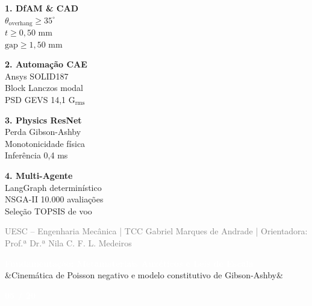 \documentclass[11pt]{article}
\newcommand{\slideheader}[3]{
    \noindent
    \begin{minipage}{\textwidth}
        \colorbox{SpaceNavy}{
            \parbox{\dimexpr\textwidth-2\fboxsep\relax}{
                \vspace{0.2cm}
                \hspace{0.3cm}
                \begin{minipage}{0.85\textwidth}
                    {\Large \textbf{\textcolor{white}{#1}}}\\[0.1cm]
                    \ifx&#2&\else{\small \textbf{\textcolor{SpaceGold}{#2}}}\fi
                \end{minipage}
                \hfill
                \begin{minipage}{0.10\textwidth}
                    \raggedleft
                    {\large \textbf{\textcolor{white}{#3 / 20}}}\hspace{0.3cm}
                \end{minipage}
                \vspace{0.2cm}
            }
        }
    \end{minipage}
    \vspace{0.4cm}
}
\newcommand{\slidefooter}{
    \vfill
    \noindent
    \begin{minipage}{\textwidth}
        \centering
        \scriptsize \textcolor{gray}{UESC -- Engenharia Mecânica | TCC Gabriel Marques de Andrade | Orientadora: Prof.ª Dr.ª Nila C. F. L. Medeiros}
    \end{minipage}
}
\begin{document}
\begin{minipage}[t]{0.23\textwidth}
    \textbf{\textcolor{SpaceNavy}{1. DfAM \& CAD}}\\[0.1cm]
    \scriptsize
    $\theta_{\text{overhang}} \ge 35^\circ$\\
    $t \ge 0{,}50\text{ mm}$\\
    $\text{gap} \ge 1{,}50\text{ mm}$
\end{minipage}
\hfill
\begin{minipage}[t]{0.23\textwidth}
    \textbf{\textcolor{SpaceNavy}{2. Automação CAE}}\\[0.1cm]
    \scriptsize
    Ansys SOLID187\\
    Block Lanczos modal\\
    PSD GEVS 14,1 G$_{\text{rms}}$
\end{minipage}
\hfill
\begin{minipage}[t]{0.23\textwidth}
    \textbf{\textcolor{SpaceNavy}{3. Physics ResNet}}\\[0.1cm]
    \scriptsize
    Perda Gibson-Ashby\\
    Monotonicidade física\\
    Inferência 0,4 ms
\end{minipage}
\hfill
\begin{minipage}[t]{0.23\textwidth}
    \textbf{\textcolor{SpaceNavy}{4. Multi-Agente}}\\[0.1cm]
    \scriptsize
    LangGraph determinístico\\
    NSGA-II 10.000 avaliações\\
    Seleção TOPSIS de voo
\end{minipage}

\slidefooter
\clearpage

\slideheader{Fundamentação: Metamateriais Auxéticos e Leis de Escala}{Cinemática de Poisson negativo e modelo constitutivo de Gibson-Ashby}{05}
\end{document}
